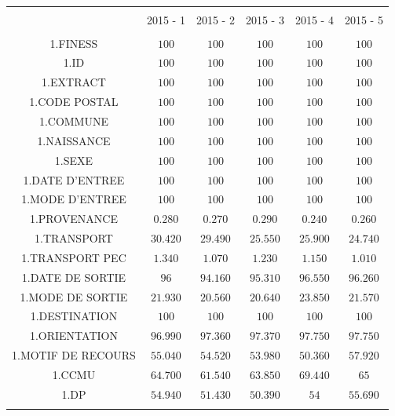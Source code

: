 \documentclass[]{article}
\begin{document}
\begin{table}[!htbp] \centering 
  \caption{} 
  \label{} 
\begin{tabular}{@{\extracolsep{5pt}} cccccc} 
\\[-1.8ex]\hline 
\hline \\[-1.8ex] 
 & 2015 - 1 & 2015 - 2 & 2015 - 3 & 2015 - 4 & 2015 - 5 \\ 
\hline \\[-1.8ex] 
1.FINESS & $100$ & $100$ & $100$ & $100$ & $100$ \\ 
1.ID & $100$ & $100$ & $100$ & $100$ & $100$ \\ 
1.EXTRACT & $100$ & $100$ & $100$ & $100$ & $100$ \\ 
1.CODE POSTAL & $100$ & $100$ & $100$ & $100$ & $100$ \\ 
1.COMMUNE & $100$ & $100$ & $100$ & $100$ & $100$ \\ 
1.NAISSANCE & $100$ & $100$ & $100$ & $100$ & $100$ \\ 
1.SEXE & $100$ & $100$ & $100$ & $100$ & $100$ \\ 
1.DATE D'ENTREE & $100$ & $100$ & $100$ & $100$ & $100$ \\ 
1.MODE D'ENTREE & $100$ & $100$ & $100$ & $100$ & $100$ \\ 
1.PROVENANCE & $0.280$ & $0.270$ & $0.290$ & $0.240$ & $0.260$ \\ 
1.TRANSPORT & $30.420$ & $29.490$ & $25.550$ & $25.900$ & $24.740$ \\ 
1.TRANSPORT PEC & $1.340$ & $1.070$ & $1.230$ & $1.150$ & $1.010$ \\ 
1.DATE DE SORTIE & $96$ & $94.160$ & $95.310$ & $96.550$ & $96.260$ \\ 
1.MODE DE SORTIE & $21.930$ & $20.560$ & $20.640$ & $23.850$ & $21.570$ \\ 
1.DESTINATION & $100$ & $100$ & $100$ & $100$ & $100$ \\ 
1.ORIENTATION & $96.990$ & $97.360$ & $97.370$ & $97.750$ & $97.750$ \\ 
1.MOTIF DE RECOURS & $55.040$ & $54.520$ & $53.980$ & $50.360$ & $57.920$ \\ 
1.CCMU & $64.700$ & $61.540$ & $63.850$ & $69.440$ & $65$ \\ 
1.DP & $54.940$ & $51.430$ & $50.390$ & $54$ & $55.690$ \\ 
\hline \\[-1.8ex] 
\end{tabular} 
\end{table}
\end{document}
